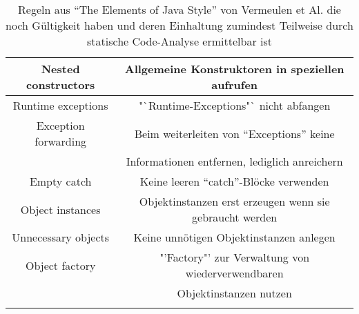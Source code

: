 \documentclass[da,ngerman]{stthesis}
\begin{document}
\begin{center}
\begin{longtabu}{|c|c|}
  						\hline
  						Nested constructors & Allgemeine Konstruktoren in speziellen aufrufen \\
  						\hline
  						Runtime exceptions & "`Runtime-Exceptions"` nicht abfangen \\
  						\hline
  						Exception forwarding & Beim weiterleiten von "`Exceptions"' keine \\ & Informationen entfernen, lediglich anreichern \\
  						\hline   
  						Empty catch & Keine leeren "`catch"'-Blöcke verwenden \\
  						\hline
  						Object instances & Objektinstanzen erst erzeugen wenn sie gebraucht werden \\
  						\hline
  						Unnecessary objects & Keine unnötigen Objektinstanzen anlegen \\
  						\hline
  						Object factory & "'Factory"' zur Verwaltung von wiederverwendbaren \\ & Objektinstanzen nutzen \\
  						\hline
  						
  						\caption{Regeln aus "`The Elements of Java Style"' von Vermeulen et Al. die noch Gültigkeit haben und deren Einhaltung zumindest Teilweise durch statische Code-Analyse ermittelbar ist \cite{ElementsOfJavaStyle}}
						\label{elementsrules}
  					\end{longtabu}   
  				\end{center}
\end{document}
